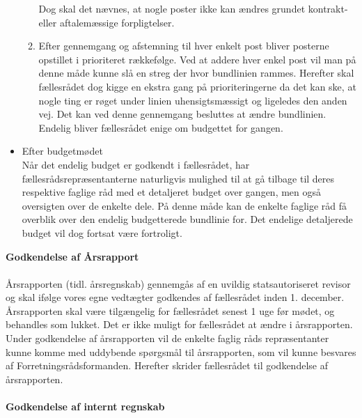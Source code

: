 \begin{itemize}
\begin{enumerate}
Dog skal det nævnes, at nogle poster ikke kan ændres grundet kontrakt- eller aftalemæssige
forpligtelser.
\item Efter gennemgang og afstemning til hver enkelt post bliver posterne opstillet i prioriteret rækkefølge.
Ved at addere hver enkel post vil man på denne måde kunne slå en streg der hvor bundlinien rammes.
Herefter skal fællesrådet dog kigge en ekstra gang på prioriteringerne da det kan ske, at nogle ting er
røget under linien uhensigtsmæssigt og ligeledes den anden vej. Det kan ved denne gennemgang
besluttes at ændre bundlinien.
Endelig bliver fællesrådet enige om budgettet for gangen.
\end{enumerate}
\item Efter budgetmødet\\ 
Når det endelig budget er godkendt i fællesrådet, har fællesrådsrepræsentanterne naturligvis mulighed til at gå tilbage til deres respektive faglige råd med et detaljeret budget over gangen, men også oversigten over de enkelte dele. På denne måde kan de enkelte faglige råd få overblik over den endelig budgetterede bundlinie for. Det endelige detaljerede budget vil dog fortsat være fortroligt.
\end{itemize}
\textbf{Godkendelse af Årsrapport}\\
\\
Årsrapporten (tidl. årsregnskab) gennemgås af en uvildig statsautoriseret revisor og skal ifølge vores egne vedtægter
godkendes af fællesrådet inden 1. december. Årsrapporten skal være tilgængelig for fællesrådet senest 1 uge før mødet,
og behandles som lukket.
Det er ikke muligt for fællesrådet at ændre i årsrapporten.
Under godkendelse af årsrapporten vil de enkelte faglig råds repræsentanter kunne komme med uddybende spørgsmål
til årsrapporten, som vil kunne besvares af Forretningsrådsformanden.
Herefter skrider fællesrådet til godkendelse af årsrapporten.\\
\\
\textbf{Godkendelse af internt regnskab}\\

